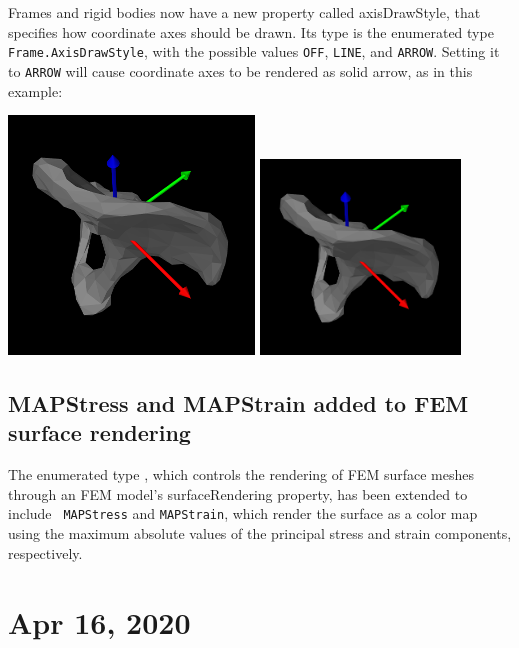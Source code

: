 \documentclass{article}
\begin{document}
Frames and rigid bodies now have a new property called {\sf
axisDrawStyle}, that specifies how coordinate axes should be drawn.
Its type is the enumerated type {\tt Frame.AxisDrawStyle}, with the
possible values {\tt OFF}, {\tt LINE}, and {\tt ARROW}.  Setting it to
{\tt ARROW} will cause coordinate axes to be rendered as solid arrow,
as in this example:
\begin{center}
\iflatexml
\includegraphics[]{images/hipBodyArrowAxes}
\else
\includegraphics[width=0.4\textwidth]{images/hipBodyArrowAxes}
\fi
\end{center}

\subsection*{MAPStress and MAPStrain added to FEM surface rendering}

The enumerated type
, which
controls the rendering of FEM surface meshes through an FEM model's
{\sf surfaceRendering} property, has been extended to include {\tt
MAPStress} and {\tt MAPStrain}, which render the surface as a color
map using the maximum absolute values of the principal stress and
strain components, respectively.

\section*{Apr 16, 2020}
\end{document}
